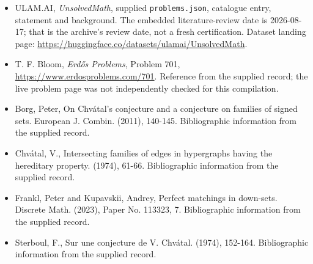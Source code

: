 \documentclass[11pt,a4paper]{article}
\begin{document}
{\small

\begin{itemize}

\item[\hypertarget{source:statement:1}{S1}] ULAM.AI, \emph{UnsolvedMath}, supplied \texttt{problems.json}, catalogue entry, statement and background. The embedded literature-review date is 2026-08-17; that is the archive’s review date, not a fresh certification. Dataset landing page: \url{https://huggingface.co/datasets/ulamai/UnsolvedMath}.

\item[\hypertarget{source:statement:2}{S2}] T. F. Bloom, \emph{Erdős Problems}, Problem 701, \url{https://www.erdosproblems.com/701}. Reference from the supplied record; the live problem page was not independently checked for this compilation.

\item[\hypertarget{source:statement:3}{S3}] Borg, Peter, On Chv\'{a}tal's conjecture and a conjecture on families of signed sets. European J. Combin. (2011), 140-145. Bibliographic information from the supplied record.

\item[\hypertarget{source:statement:4}{S4}] Chv\'{a}tal, V., Intersecting families of edges in hypergraphs having the hereditary property. (1974), 61-66. Bibliographic information from the supplied record.

\item[\hypertarget{source:statement:5}{S5}] Frankl, Peter and Kupavskii, Andrey, Perfect matchings in down-sets. Discrete Math. (2023), Paper No. 113323, 7. Bibliographic information from the supplied record.

\item[\hypertarget{source:statement:6}{S6}] Sterboul, F., Sur une conjecture de V. Chv\'{a}tal. (1974), 152-164. Bibliographic information from the supplied record.

\end{itemize}

}

\label{end:statement}
\end{document}
